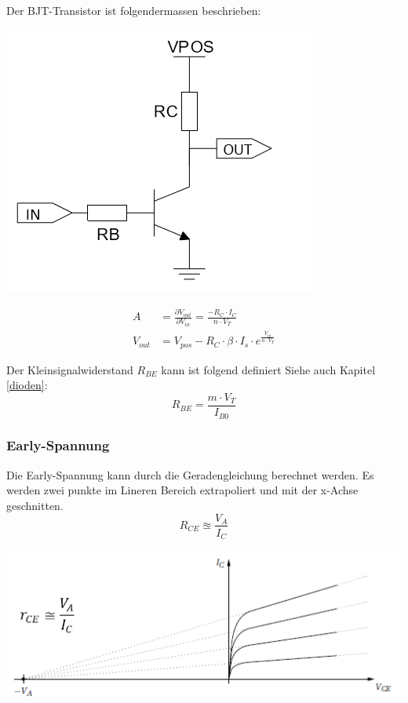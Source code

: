 \noindent Der BJT-Transistor ist folgendermassen beschrieben:
\begin{minipage}{0.20\textwidth}
	\includegraphics[width=\linewidth,keepaspectratio=true]{./Images/bjt}
\end{minipage}%
\begin{minipage}{0.30\textwidth}
	\begin{align*}
		A &= \frac{\partial V_{out}}{\partial V_{in}} = \frac{-R_C \cdot I_C}{n\cdot V_T}  \\
		V_{out} &= V_{pos} - R_C\cdot\beta\cdot I_s\cdot e^{\frac{V_{in}}{n\cdot V_T}}
	\end{align*}
\end{minipage}

\noindent Der Kleinsignalwiderstand $R_{BE}$ kann ist folgend definiert Siehe auch Kapitel \ref{dioden}: \[R_{BE} = \frac{m\cdot V_T}{I_{B0}}\]

\subsubsection{Early-Spannung}
Die Early-Spannung kann durch die Geradengleichung berechnet werden. Es werden zwei punkte im Lineren Bereich extrapoliert und mit der x-Achse geschnitten.
\[
R_{CE} \approxeq \frac{V_A}{I_C}
\]
\begin{center}
	\includegraphics[width=0.7\columnwidth]{Images/early-spannung}
\end{center}


